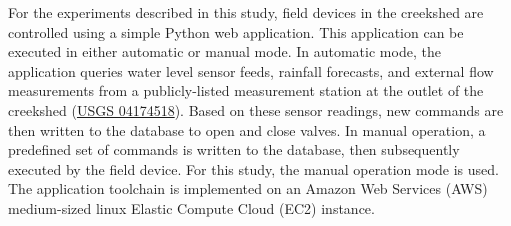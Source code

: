 For the experiments described in this study, field devices in the creekshed are controlled using a simple Python web application. This application can be executed in either automatic or manual mode. In automatic mode, the application queries water level sensor feeds, rainfall forecasts, and external flow measurements from a publicly-listed measurement station at the outlet of the creekshed (\href{https://waterdata.usgs.gov/usa/nwis/uv?04174518}{USGS 04174518}). Based on these sensor readings, new commands are then written to the database to open and close valves. In manual operation, a predefined set of commands is written to the database, then subsequently executed by the field device. For this study, the manual operation mode is used. 
The application toolchain is implemented on an Amazon Web Services (AWS) medium-sized linux Elastic Compute Cloud (EC2) instance. 




